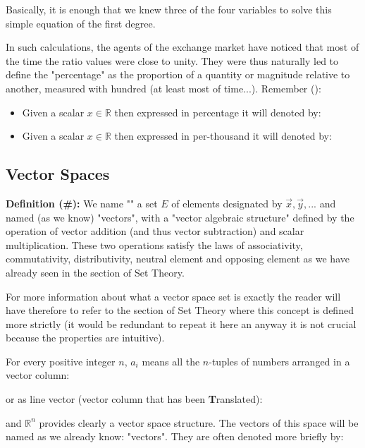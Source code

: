 	Basically, it is enough that we knew three of the four variables to solve this simple equation of the first degree.

	In such calculations, the agents of the exchange market have noticed that most of the time the ratio values were close to unity. They were thus naturally led to define the "percentage" as the proportion of a quantity or magnitude relative to another, measured with hundred (at least most of time...). Remember ():

	\begin{itemize}
		\item Given a scalar $x \in \mathbb{R}$ then expressed in percentage it will denoted by:
			
		\item Given a scalar $x \in \mathbb{R}$ then expressed in per-thousand it will denoted by:
			
	\end{itemize}

	\subsection{Vector Spaces}

\textbf{Definition (\#\mydef):} We name "" a set $E$ of elements designated by $\vec{x},\vec{y},...$ and named (as we know) "vectors", with a "vector algebraic structure" defined by the operation of vector addition (and thus vector subtraction) and scalar multiplication. These two operations satisfy the laws of associativity, commutativity, distributivity, neutral element and opposing element as we have already seen in the section of Set Theory.

	For more information about what a vector space set is exactly  the reader will have therefore to refer to the section of Set Theory where this concept is defined more strictly (it would be redundant to repeat it here an anyway it is not crucial because the properties are intuitive).

	For every positive integer $n$, $a_i$ means all the $n$-tuples of numbers arranged in a vector column:
	
	or as line vector (vector column that has been \textbf{T}ranslated):
	
	and $\mathbb{R}^n$ provides clearly a vector space structure. The vectors of this space will be named as we already know: "vectors". They are often denoted more briefly by:
	
